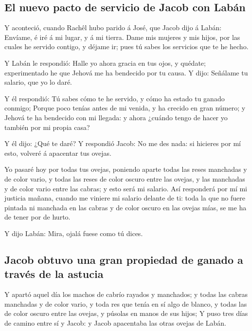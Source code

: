 \hypertarget{el-nuevo-pacto-de-servicio-de-jacob-con-labuxe1n}{%
\subsection{El nuevo pacto de servicio de Jacob con
Labán}\label{el-nuevo-pacto-de-servicio-de-jacob-con-labuxe1n}}

 Y aconteció, cuando Rachêl hubo parido á José, que Jacob
dijo á Labán: Envíame, é iré á mi lugar, y á mi tierra. 
Dame mis mujeres y mis hijos, por las cuales he servido contigo, y
déjame ir; pues tú sabes los servicios que te he hecho.

 Y Labán le respondió: Halle yo ahora gracia en tus ojos, y
quédate; experimentado he que Jehová me ha bendecido por tu causa.
 Y dijo: Señálame tu salario, que yo lo daré.

 Y él respondió: Tú sabes cómo te he servido, y cómo ha
estado tu ganado conmigo;  Porque poco tenías antes de mi
venida, y ha crecido en gran número; y Jehová te ha bendecido con mi
llegada: y ahora ¿cuándo tengo de hacer yo también por mi propia casa?

 Y él dijo: ¿Qué te daré? Y respondió Jacob: No me des
nada: si hicieres por mí esto, volveré á apacentar tus ovejas.

 Yo pasaré hoy por todas tus ovejas, poniendo aparte todas
las reses manchadas y de color vario, y todas las reses de color oscuro
entre las ovejas, y las manchadas y de color vario entre las cabras; y
esto será mi salario.  Así responderá por mí mi justicia
mañana, cuando me viniere mi salario delante de ti: toda la que no fuere
pintada ni manchada en las cabras y de color oscuro en las ovejas mías,
se me ha de tener por de hurto.

 Y dijo Labán: Mira, ojalá fuese como tú dices.

\hypertarget{jacob-obtuvo-una-gran-propiedad-de-ganado-a-travuxe9s-de-la-astucia}{%
\subsection{Jacob obtuvo una gran propiedad de ganado a través de la
astucia}\label{jacob-obtuvo-una-gran-propiedad-de-ganado-a-travuxe9s-de-la-astucia}}

 Y apartó aquel día los machos de cabrío rayados y
manchados; y todas las cabras manchadas y de color vario, y toda res que
tenía en sí algo de blanco, y todas las de color oscuro entre las
ovejas, y púsolas en manos de sus hijos;  Y puso tres días
de camino entre sí y Jacob: y Jacob apacentaba las otras ovejas de
Labán.

